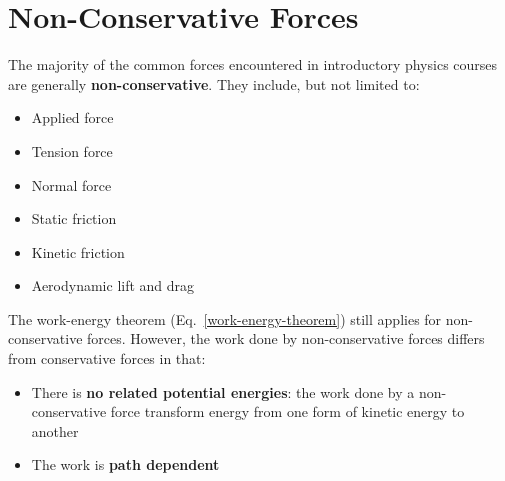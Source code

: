 \documentclass[11pt]{article}
\begin{document}
%
%


\section{Non-Conservative Forces}
The majority of the common forces encountered in introductory physics courses
are generally \textbf{non-conservative}. They include, but not limited to:
\begin{itemize}[nosep]
\item Applied force
\item Tension force
\item Normal force
\item Static friction
\item Kinetic friction
\item Aerodynamic lift and drag 
\end{itemize}
The work-energy theorem (Eq.~\ref{work-energy-theorem}) still applies for
non-conservative forces. However, the work done by non-conservative forces
differs from conservative forces in that:
\begin{itemize}
\item There is \textbf{no related potential energies}: the work done by a
  non-conservative force transform energy from one form of kinetic energy to
  another
\item The work is \textbf{path dependent}
\end{itemize}
\end{document}
